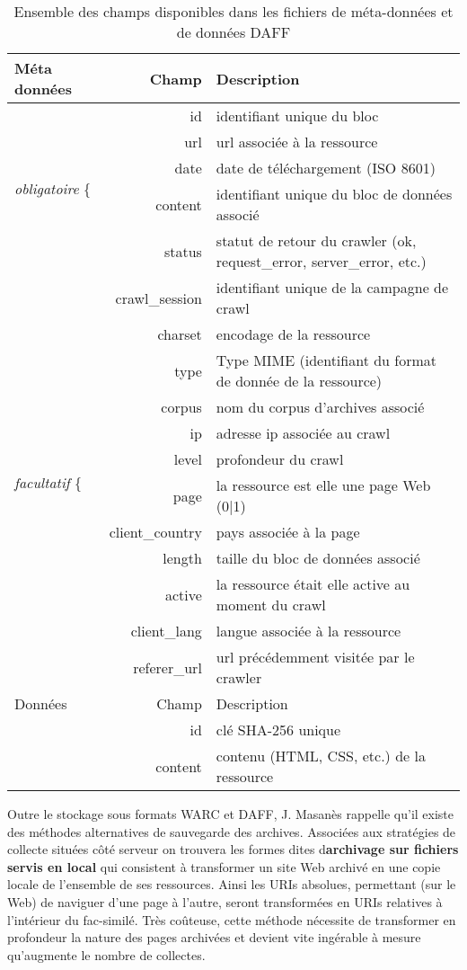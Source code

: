 \documentclass[symmetric,justified,marginals=raggedouter]{tufte-book}
\makeatletter
\newcommand{\vastt}{\bBigg@{4}}
\newcommand{\Vastt}{\bBigg@{11}}
\makeatother
\begin{document}
\begin{table*}
  \label{tab:daff}
  \begin{tabular}{lrl}
    \toprule
    Méta données& Champ & Description\\
    \midrule  
    \multirow{5}{*}{\emph{obligatoire} \vastt\{ }&id&identifiant unique du bloc\\
    &url&url associée à la ressource\\
    &date&date de téléchargement (ISO 8601)\\
    &content&identifiant unique du bloc de données associé\\     
    &status&statut de retour du crawler (ok, request\_error, server\_error, etc.)\\
    \midrule     
    \multirow{12}{*}{\emph{facultatif   } \Vastt\{ }&crawl\_session&identifiant unique de la campagne de crawl\\
    &charset&encodage de la ressource\\
    &type&Type MIME (identifiant du format de donnée de la ressource)\\
    &corpus&nom du corpus d'archives associé\\
    &ip&adresse ip associée au crawl\\
    &level&profondeur du crawl\\
    &page&la ressource est elle une page Web (0|1)\\
    &client\_country&pays associée à la page\\
    &length&taille du bloc de données associé\\
	&active&la ressource était elle active au moment du crawl\\
	&client\_lang&langue associée à la ressource\\
	&referer\_url&url précédemment visitée par le crawler\\
    \midrule
    Données& Champ & Description\\
    \midrule 
    &id&clé SHA-256 unique\\
    &content&contenu (HTML, CSS, etc.) de la ressource\\    	
    \bottomrule
\end{tabular}
  \bigskip
  \caption{Ensemble des champs disponibles dans les fichiers de méta-données et de données DAFF}
\end{table*} 

\noindent Outre le stockage sous formats WARC et DAFF, J. Masanès \citep[p.64]{masanes_web_2006} rappelle qu'il existe des méthodes alternatives de sauvegarde des archives. Associées aux stratégies de collecte situées côté serveur on trouvera les formes dites d\textbf{archivage sur fichiers servis en local} qui consistent à transformer un site Web archivé en une copie locale de l'ensemble de ses ressources. Ainsi les URIs absolues, permettant (sur le Web) de naviguer d'une page à l'autre, seront transformées en URIs relatives à l'intérieur du fac-similé. Très coûteuse, cette méthode nécessite de transformer en profondeur la nature des pages archivées et devient vite ingérable à mesure qu'augmente le nombre de collectes.
\end{document}

